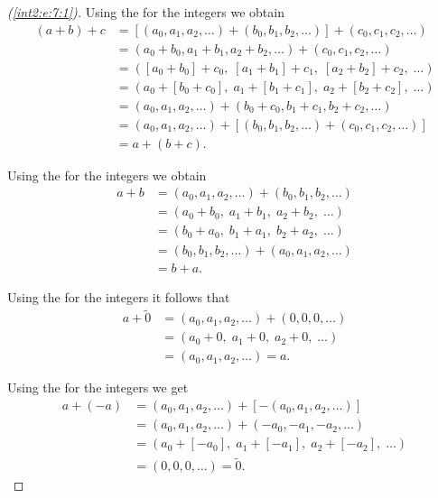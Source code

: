 \begin{proof}[(\ref{int2:e:7:1})]
	Using the  for the integers we obtain
	\begin{align*}
		(a + b) + c & = [(a_0, a_1, a_2, \ldots) + (b_0, b_1, b_2, \ldots)] + (c_0, c_1, c_2, \ldots) \\
		            & = (a_0 + b_0, a_1 + b_1, a_2 + b_2, \ldots) + (c_0, c_1, c_2, \ldots)           \\
		            & = ([a_0 + b_0] + c_0,\; [a_1 + b_1] + c_1,\; [a_2 + b_2] + c_2,\; \ldots)       \\
		            & = (a_0 + [b_0 + c_0],\; a_1 + [b_1 + c_1],\; a_2 + [b_2 + c_2],\; \ldots)       \\
		            & = (a_0, a_1, a_2, \ldots) + (b_0 + c_0, b_1 + c_1, b_2 + c_2, \ldots)           \\
		            & = (a_0, a_1, a_2, \ldots) + [(b_0, b_1, b_2, \ldots) + (c_0, c_1, c_2, \ldots)] \\
		            & = a + (b + c).
	\end{align*}

	Using the  for the integers we obtain
	\begin{align*}
		a + b & = (a_0, a_1, a_2, \ldots) + (b_0, b_1, b_2, \ldots) \\
		      & = (a_0 + b_0,\; a_1 + b_1,\; a_2 + b_2,\; \ldots)   \\
		      & = (b_0 + a_0,\; b_1 + a_1,\; b_2 + a_2,\; \ldots)   \\
		      & = (b_0, b_1, b_2, \ldots) + (a_0, a_1, a_2, \ldots) \\
		      & = b + a.
	\end{align*}

	Using the  for the integers it follows that
	\begin{align*}
		a + \widetilde{0} & = (a_0, a_1, a_2, \ldots) + (0, 0, 0, \ldots) \\
		                  & = (a_0 + 0,\; a_1 + 0,\; a_2 + 0,\; \ldots)   \\
		                  & = (a_0, a_1, a_2, \ldots) = a.
	\end{align*}

	Using the  for the integers we get
	\begin{align*}
		a + (-a) & = (a_0, a_1, a_2, \ldots) + [-(a_0, a_1, a_2, \ldots)]     \\
		         & = (a_0, a_1, a_2, \ldots) + (-a_0, -a_1, -a_2, \ldots)     \\
		         & = (a_0 + [-a_0],\; a_1 + [-a_1],\; a_2 + [-a_2],\; \ldots) \\
		         & = (0, 0, 0, \ldots) = \widetilde{0}.
	\end{align*}


\end{proof}
